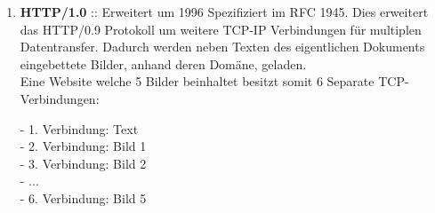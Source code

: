 \documentclass[11pt]{article}
\begin{document}
\begin{enumerate}[\thesection .1]
\begin{enumerate}[$\diamond$]
        \underline{Beispiel: Request \& Response}\\
        Ein HTTP-Request wird an einen Server gestellt.
        \begin{addmargin}[1em]{1em}
            \emph{"GET http://www.uni-klu.ac.at:80/myapp/index.html"}
        \end{addmargin}
        Der Server überprüft diese Anfrage.
        \begin{addmargin}[1em]{1em}
            Gibt es dieses Dokument?\\
            Darf der User darauf zugreifen?\\
            Ist es ein dynamisch generiertes Dokument?\\
            Ist das GET-Format richtig? ... u.s.w.
        \end{addmargin}
        Der Server sendet anschließend eine Nachricht zurück zum Anfragensteller.\\
        \footnote[1 Vgl.: HTTP-Statuscodes]{Siehe https://de.wikipedia.org/wiki/HTTP-Statuscode}
        \begin{addmargin}[1em]{1em}
            Information - 100++: Continue, Switching Protocols, Processing\\
            Erfolgreich - 200++: OK, Accepted, Non-Authoritative Information,...\\
            Umleitungen - 300++: Moved permanently, See other, Use Proxy, ...\\
            Client-Fehler - 400++: Bad Request, Unauthorized, Forbidden, Not Found, ...\\
            Server-Fehler - 500++: Internal Server Error, Bad Gateway, Service N/A,...
        \end{addmargin}
        Der Browser des Anfragenstellers erhält das Dokument und rendert gemäß .css/.php/... .
        Bei vollständiger Übertragung des abgerufenen Protokolls unterbricht der Server die Verbindung zum Klienten.\\

        \item \textbf{HTTP/1.0} :: Erweitert um 1996
        Spezifiziert im RFC 1945. Dies erweitert das HTTP/0.9 Protokoll um weitere TCP-IP Verbindungen für multiplen Datentransfer.
        Dadurch werden neben Texten des eigentlichen Dokuments eingebettete Bilder, anhand deren Domäne, geladen.\\
        Eine Website welche 5 Bilder beinhaltet besitzt somit 6 Separate TCP-Verbindungen:
        \begin{addmargin}[1em]{1em}
            - 1. Verbindung: Text\\
            - 2. Verbindung: Bild 1\\
            - 3. Verbindung: Bild 2\\
            - ...\\
            - 6. Verbindung: Bild 5\\
        \end{addmargin}


\end{enumerate}
\end{enumerate}
\end{document}
